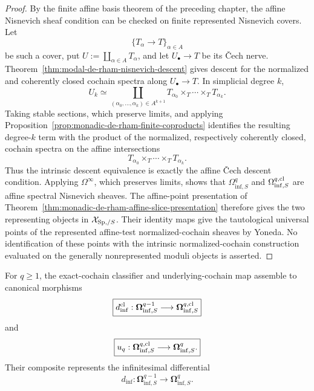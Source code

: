 \begin{proof}
By the finite affine basis theorem of the preceding chapter, the affine Nisnevich sheaf condition can
be checked on finite represented Nisnevich covers.  Let
\[
    \{T_\alpha\to T\}_{\alpha\in A}
\]
be such a cover, put \(U:=\coprod_{\alpha\in A}T_\alpha\), and let \(U_\bullet\to T\) be its
\v{C}ech nerve.  Theorem~\ref{thm:modal-de-rham-nisnevich-descent} gives descent for the normalized
and coherently closed cochain spectra along \(U_\bullet\to T\).  In simplicial degree \(k\),
\[
    U_k
    \simeq
    \coprod_{(\alpha_0,\ldots,\alpha_k)\in A^{k+1}}
    T_{\alpha_0}\times_T\cdots\times_TT_{\alpha_k}.
\]
Taking stable sections, which preserve limits, and applying
Proposition~\ref{prop:monadic-de-rham-finite-coproducts} identifies the resulting degree-\(k\) term
with the product of the normalized, respectively coherently closed, cochain spectra on the affine
intersections
\[
    T_{\alpha_0}\times_T\cdots\times_TT_{\alpha_k}.
\]
Thus the intrinsic descent equivalence is exactly the affine \v{C}ech descent condition.  Applying
\(\Omega^\infty\), which preserves limits, shows that
\(\Omega_{\mathrm{inf},S}^q\) and \(\Omega_{\mathrm{inf},S}^{q,\mathrm{cl}}\) are affine spectral
Nisnevich sheaves.  The affine-point presentation of
Theorem~\ref{thm:monadic-de-rham-affine-slice-presentation} therefore gives the two representing
objects in \(\mathcal X_{\mathrm{Sp},/S}\).  Their identity maps give the tautological universal points of
the represented affine-test normalized-cochain sheaves by Yoneda.  No identification of these points
with the intrinsic normalized-cochain construction evaluated on the generally nonrepresented moduli
objects is asserted.
\end{proof}

\begin{proposition}
\label{prop:monadic-de-rham-moduli-differential}
For \(q\geq1\), the exact-cochain classifier and underlying-cochain map assemble to canonical morphisms
\[
\boxed{
    d_{\inf}^{\mathrm{cl}}:
    \boldsymbol{\Omega}_{\mathrm{inf},S}^{q-1}
    \longrightarrow
    \boldsymbol{\Omega}_{\mathrm{inf},S}^{q,\mathrm{cl}}
}
\]
and
\[
\boxed{
    u_q:
    \boldsymbol{\Omega}_{\mathrm{inf},S}^{q,\mathrm{cl}}
    \longrightarrow
    \boldsymbol{\Omega}_{\mathrm{inf},S}^{q}.
}
\]
Their composite represents the infinitesimal differential
\[
\boxed{
    d_{\inf}:
    \boldsymbol{\Omega}_{\mathrm{inf},S}^{q-1}
    \longrightarrow
    \boldsymbol{\Omega}_{\mathrm{inf},S}^{q}.
}
\]
\end{proposition}


